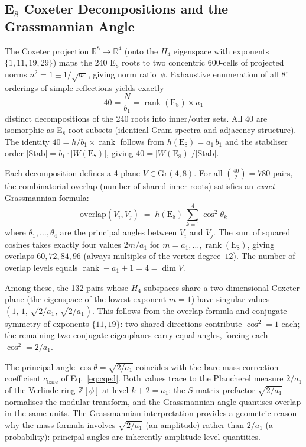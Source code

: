 \documentclass[12pt,a4paper]{article}
\theoremstyle{definition}
\begin{document}
\subsection{E\texorpdfstring{$_8$}{8} Coxeter Decompositions and the Grassmannian Angle}
\label{sec:S-grassmannian}

The Coxeter projection $\mathbb{R}^8 \to \mathbb{R}^4$ (onto the $H_4$ eigenspace with exponents $\{1,11,19,29\}$) maps the 240 E$_8$ roots to two concentric 600-cells of projected norms $n^2 = 1 \pm 1/\sqrt{a_1}$, giving norm ratio~$\phi$.  Exhaustive enumeration of all $8!$ orderings of simple reflections yields exactly
\begin{equation}
40 = \frac{N}{b_1} = \operatorname{rank}(\mathrm{E}_8) \times a_1
\label{eq:40decomp}
\end{equation}
distinct decompositions of the 240 roots into inner/outer sets.  All 40 are isomorphic as E$_8$ root subsets (identical Gram spectra and adjacency structure).  The identity $40 = h/b_1 \times \operatorname{rank}$ follows from $h(\mathrm{E}_8) = a_1 \, b_1$ and the stabiliser order $|\mathrm{Stab}| = b_1 \cdot |W(\mathrm{E}_7)|$, giving $40 = |W(\mathrm{E}_8)|/|\mathrm{Stab}|$.

Each decomposition defines a 4-plane $V \in \mathrm{Gr}(4,8)$.  For all $\binom{40}{2} = 780$ pairs, the combinatorial overlap (number of shared inner roots) satisfies an \emph{exact} Grassmannian formula:
\begin{equation}
\mathrm{overlap}(V_i, V_j) \;=\; h(\mathrm{E}_8)\,\sum_{k=1}^{4} \cos^2\theta_k
\label{eq:overlap_grass}
\end{equation}
where $\theta_1, \ldots, \theta_4$ are the principal angles between $V_i$ and $V_j$.  The sum of squared cosines takes exactly four values $2m/a_1$ for $m = a_1, \ldots, \operatorname{rank}(\mathrm{E}_8)$, giving overlaps $60, 72, 84, 96$ (always multiples of the vertex degree~$12$).  The number of overlap levels equals $\operatorname{rank} - a_1 + 1 = 4 = \dim V$.

Among these, the 132 pairs whose $H_4$ subspaces share a two-dimensional Coxeter plane (the eigenspace of the lowest exponent $m = 1$) have singular values $(1,\,1,\,\sqrt{2/a_1},\,\sqrt{2/a_1})$.  This follows from the overlap formula and conjugate symmetry of exponents $\{11, 19\}$: two shared directions contribute $\cos^2 = 1$ each; the remaining two conjugate eigenplanes carry equal angles, forcing each $\cos^2 = 2/a_1$.

The principal angle $\cos\theta = \sqrt{2/a_1}$ coincides with the bare mass-correction coefficient $c_{\mathrm{bare}}$ of Eq.~\eqref{eq:cqed}.  Both values trace to the Plancherel measure $2/a_1$ of the Verlinde ring $\mathbb{Z}[\phi]$ at level $k + 2 = a_1$: the $S$-matrix prefactor $\sqrt{2/a_1}$ normalises the modular transform, and the Grassmannian angle quantises overlap in the same units.  The Grassmannian interpretation provides a geometric reason why the mass formula involves $\sqrt{2/a_1}$ (an amplitude) rather than $2/a_1$ (a probability): principal angles are inherently amplitude-level quantities.
\end{document}
